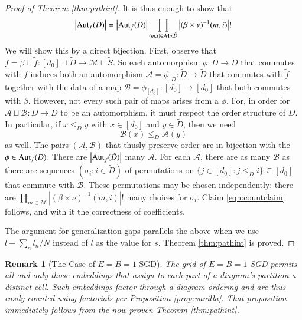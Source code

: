 \documentclass[anon,12pt]{colt2021} %
\newtheorem{rmk}{Remark}
\newcommand{\wabs}[1]{\left|#1\right|}
\newcommand{\Aut}{\text{\textnormal{Aut}}}
\newcommand{\Aa}{\mathcal{A}}
\newcommand{\Bb}{\mathcal{B}}
\newcommand{\Mm}{\mathcal{M}}
\begin{document}
\begin{proof}[Proof of Theorem \ref{thm:pathint}]
            It is thus enough to show that
            \begin{align*} \label{eqn:countclaim}
                \wabs{\Aut_f(D)} = 
                \wabs{\Aut_{\tilde f}(D)}
                \prod_{(m, i) \in \Mm \times \tilde D}
                    \wabs{(\beta \times \nu)^{-1}(m, i)}!
            \end{align*}
            We will show this by a direct bijection.  First, observe that
            $
                f = \beta \sqcup \tilde f:
                    [d_0] \sqcup \tilde D \to \Mm \sqcup \tilde S
            $. 
            So each automorphism $\phi: D\to D$ that commutes with $f$ induces
            both an automorphism
            $
                \Aa = \phi|_{\tilde D}: \tilde D\to \tilde D
            $
            that commutes with $\tilde f$ together with the data of a map
            $
                \Bb = \phi_{[d_0]}: [d_0] \to [d_0] 
            $
            that both commutes with $\beta$.  However, not every such pair of
            maps arises from a $\phi$.  For, in order for $\Aa \sqcup \Bb: D
            \to D$ to be an automorphism, it must respect the order structure
            of $D$.  In particular, if $x\leq_D y$ with $x \in [d_0]$ and $y
            \in \tilde D$, then we need
            $$
                \Bb(x) \leq_D \Aa(y)
            $$
            as well.  The
            pairs $(\Aa, \Bb)$ that thusly preserve order are in bijection with
            the $\phi \in \Aut_f(D)$.  There are $\wabs{\Aut_{\tilde f}(\tilde
            D)}$ many $\Aa$.  For each $\Aa$, there are as many $\Bb$ as there
            are sequences $(\sigma_i: i \in \tilde D)$ of permutations on
            $
                \{j\in [d_0]: j\leq_D i\} \subseteq [d_0]
            $ 
            that commute with $\Bb$.  These permutations may be chosen
            independently; there are 
            $
                \prod_{m\in \Mm}
                    \wabs{(\beta \times \nu)^{-1}(m, i)}!
            $
            many choices for $\sigma_i$.  Claim \ref{eqn:countclaim} follows,
            and with it the correctness of coefficients.
 
            The argument for generalization gaps parallels the above when we
            use $l-\sum_n l_n/N$ instead of $l$ as the value for $s$. 
            Theorem \ref{thm:pathint} is proved.
        \end{proof}

        \begin{rmk}[The Case of $E=B=1$ SGD]
            The grid of $E=B=1$ SGD permits all and only those
            embeddings that assign to each part of a diagram's partition  a
            distinct cell.  Such embeddings factor through a diagram
            ordering and are thus easily counted using factorials per
            Proposition \ref{prop:vanilla}.  That proposition immediately
            follows from the now-proven Theorem \ref{thm:pathint}.
        \end{rmk}
\end{document}
